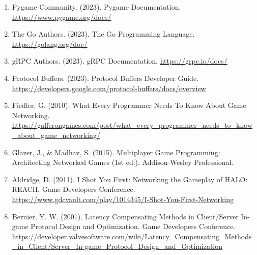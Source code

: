 \documentclass[12pt,letterpaper]{article}
\begin{document}
\begin{enumerate}
    \item Pygame Community. (2023). Pygame Documentation. \url{https://www.pygame.org/docs/}
    \item The Go Authors. (2023). The Go Programming Language. \url{https://golang.org/doc/}
    \item gRPC Authors. (2023). gRPC Documentation. \url{https://grpc.io/docs/}
    \item Protocol Buffers. (2023). Protocol Buffers Developer Guide. \url{https://developers.google.com/protocol-buffers/docs/overview}
    \item Fiedler, G. (2010). What Every Programmer Needs To Know About Game Networking. \url{https://gafferongames.com/post/what_every_programmer_needs_to_know_about_game_networking/}
    \item Glazer, J., & Madhav, S. (2015). Multiplayer Game Programming: Architecting Networked Games (1st ed.). Addison-Wesley Professional.
    \item Aldridge, D. (2011). I Shot You First: Networking the Gameplay of HALO: REACH. Game Developers Conference. \url{https://www.gdcvault.com/play/1014345/I-Shot-You-First-Networking}
    \item Bernier, Y. W. (2001). Latency Compensating Methods in Client/Server In-game Protocol Design and Optimization. Game Developers Conference. \url{https://developer.valvesoftware.com/wiki/Latency_Compensating_Methods_in_Client/Server_In-game_Protocol_Design_and_Optimization}
\end{enumerate}
\end{document}
